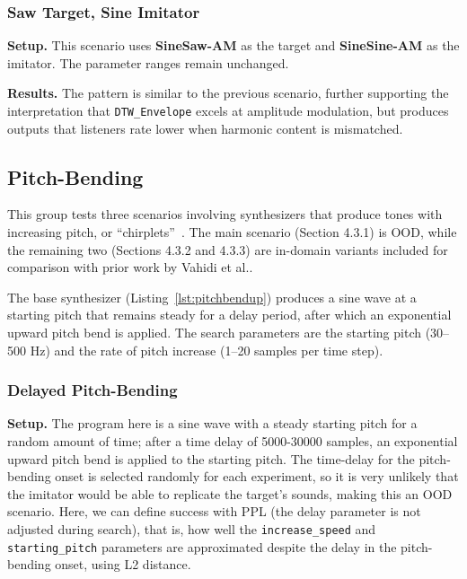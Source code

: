 \documentclass[10pt]{article} %
\newcommand{\DTWEnv}{\texttt{DTW\_\allowbreak Envelope}\xspace}
\newcommand{\FMMod}{\textbf{SineSaw-AM}\xspace}
\newcommand{\FMModvtwo}{\textbf{SineSine-AM}\xspace}
\begin{document}
\subsubsection{Saw Target, Sine Imitator}
\label{sec:am_sawtarget_sineimitate}
\textbf{Setup.} This scenario uses \FMMod as the target and \FMModvtwo as the imitator. The parameter ranges remain unchanged. 

\noindent \textbf{Results.}  The pattern is similar to the previous scenario, further supporting the interpretation that \DTWEnv excels at amplitude modulation, but produces outputs that listeners rate lower when harmonic content is mismatched.


\subsection{Pitch-Bending}
\label{sec:chirplet_scenarios}
This group tests three scenarios involving synthesizers that produce tones with increasing pitch, or ``chirplets''~\cite{mann1995chirplet,lostanlen2019shape}. The main scenario (Section 4.3.1) is OOD, while the remaining two (Sections 4.3.2 and 4.3.3) are in-domain variants included for comparison with prior work by Vahidi et al.\cite{vahidi2023mesostructures}. 

The base synthesizer (Listing~\ref{lst:pitchbendup}) produces a sine wave at a starting pitch that remains steady for a delay period, after which an exponential upward pitch bend is applied. The search parameters are the starting pitch (30–500 Hz) and the rate of pitch increase (1–20 samples per time step).


\subsubsection{Delayed Pitch-Bending}
\label{sec:delayed_chirplet}
\textbf{Setup.} The program here is a sine wave with a steady starting pitch for a random amount of time; after a time delay of 5000-30000 samples, an exponential upward pitch bend is applied to the starting pitch. The time-delay for the pitch-bending onset is selected randomly for each experiment, so it is very unlikely that the imitator would be able to replicate the target's sounds, making this an OOD scenario. Here, we can define success with PPL (the delay parameter is not adjusted during search), that is, how well the \texttt{increase\_speed} and \texttt{starting\_pitch} parameters are approximated despite the delay in the pitch-bending onset, using L2 distance. 
\end{document}
